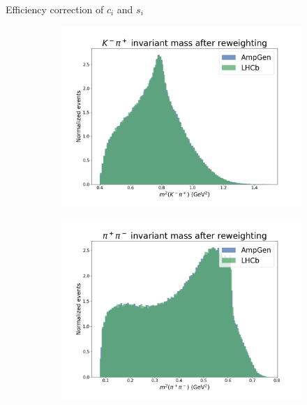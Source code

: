 \documentclass{beamer}
\begin{document}
\begin{frame}{Efficiency correction of $c_i$ and $s_i$}
\begin{figure}
\begin{subfigure}{0.33\textwidth}
      \includegraphics[width = 1.0\textwidth]{Plots/s12_AfterReweighting.png}
    \end{subfigure}
    \begin{subfigure}{0.33\textwidth}
      \includegraphics[width = 1.0\textwidth]{Plots/s23_AfterReweighting.png}
    \end{subfigure}%
    \begin{subfigure}{0.33\textwidth}

\end{subfigure}
\end{figure}
\end{frame}
\end{document}

